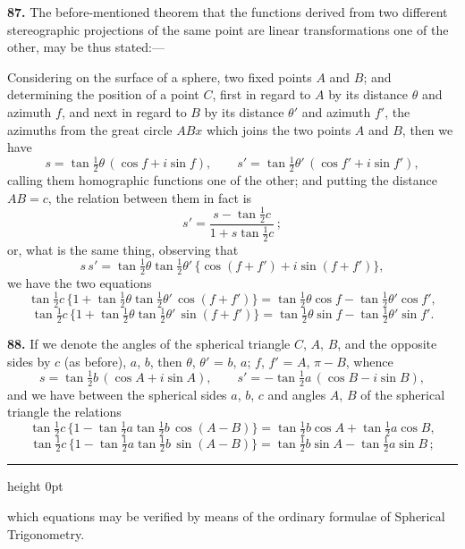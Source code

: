 \documentclass[11pt,a4paper]{article}
\newcommand{\artno}[1]{\textbf{#1.}\quad}
\begin{document}
\artno{87} The before-mentioned theorem that the functions derived from two
different stereographic projections of the same point are linear
transformations one of the other, may be thus stated:---

Considering on the surface of a sphere, two fixed points $A$ and $B$; and
determining the position of a point $C$, first in regard to $A$ by its
distance $\theta$ and azimuth $f$, and next in regard to $B$ by its distance
$\theta'$ and azimuth $f'$, the azimuths from the great circle $ABx$ which
joins the two points $A$ and $B$, then we have
\[
  s = \tan\tfrac{1}{2}\theta\,(\cos f + i\sin f),\qquad
  s' = \tan\tfrac{1}{2}\theta'\,(\cos f' + i\sin f'),
\]
calling them homographic functions one of the other; and putting the
distance $AB = c$, the relation between them in fact is
\[
  s' = \frac{s - \tan\tfrac{1}{2}c}{1 + s\tan\tfrac{1}{2}c}\,;
\]
or, what is the same thing, observing that
\[
  s\,s' = \tan\tfrac{1}{2}\theta\tan\tfrac{1}{2}\theta'\,
          \{\cos(f + f') + i\sin(f + f')\},
\]
we have the two equations
\[
  \tan\tfrac{1}{2}c\,\{1 + \tan\tfrac{1}{2}\theta\tan\tfrac{1}{2}\theta'\,
                        \cos(f + f')\}
    = \tan\tfrac{1}{2}\theta\cos f - \tan\tfrac{1}{2}\theta'\cos f',
\]
\[
  \tan\tfrac{1}{2}c\,\{1 + \tan\tfrac{1}{2}\theta\tan\tfrac{1}{2}\theta'\,
                        \sin(f + f')\}
    = \tan\tfrac{1}{2}\theta\sin f - \tan\tfrac{1}{2}\theta'\sin f'.
\]

\artno{88} If we denote the angles of the spherical triangle $C$, $A$, $B$,
and the opposite sides by $c$ (as before), $a$, $b$, then $\theta$,
$\theta'$ = $b$, $a$; $f$, $f'$ = $A$, $\pi - B$, whence
\[
  s = \tan\tfrac{1}{2}b\,(\cos A + i\sin A),\qquad
  s' = -\tan\tfrac{1}{2}a\,(\cos B - i\sin B),
\]
and we have between the spherical sides $a$, $b$, $c$ and angles $A$, $B$
of the spherical triangle the relations
\[
  \tan\tfrac{1}{2}c\,\{1 - \tan\tfrac{1}{2}a\tan\tfrac{1}{2}b\,
                       \cos(A - B)\}
    = \tan\tfrac{1}{2}b\cos A + \tan\tfrac{1}{2}a\cos B,
\]
\[
  \tan\tfrac{1}{2}c\,\{1 - \tan\tfrac{1}{2}a\tan\tfrac{1}{2}b\,
                       \sin(A - B)\}
    = \tan\tfrac{1}{2}b\sin A - \tan\tfrac{1}{2}a\sin B\,;
\]

\bigskip
\hrule height 0pt
\bigskip

\noindent
which equations may be verified by means of the ordinary formulae of
Spherical Trigonometry.
\end{document}
